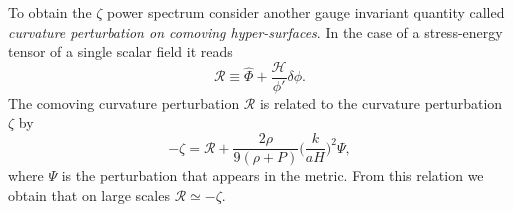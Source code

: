 \documentclass[11pt,a4paper,twoside]{book}
\begin{document}
To obtain the $\zeta$ power spectrum consider another gauge invariant quantity called \textit{curvature perturbation on comoving hyper-surfaces}. In the case of a stress-energy tensor of a single scalar field it reads
\begin{equation}
	\label{R}
	\mathcal{R} \equiv \hat{\Phi} + \frac{\mathcal{H}}{\phi'}\delta \phi.
\end{equation}
The comoving curvature perturbation $\mathcal{R}$ is related to the curvature perturbation $\zeta$ by
\begin{equation}
	- \zeta = \mathcal{R} + \frac{2\rho}{9(\rho + P)} \Big (\frac{k}{aH}\Big)^{2}\Psi,
\end{equation}
where $\Psi$ is the perturbation that appears in the metric. 
From this relation we obtain that on large scales $\mathcal{R} \simeq -\zeta$.
\end{document}
